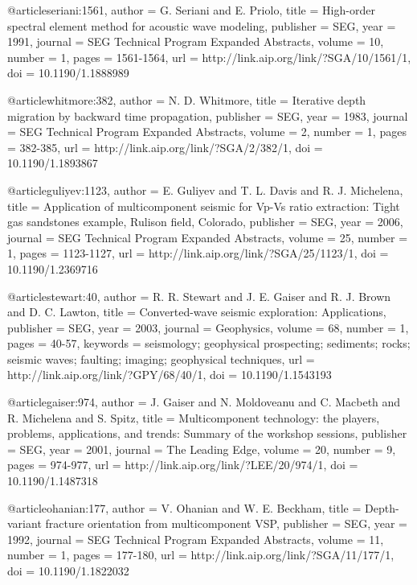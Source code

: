 {@article{seriani:1561,
  author =	 {G. Seriani and E. Priolo},
  title =	 {High-order spectral element method for acoustic wave
                  modeling},
  publisher =	 {SEG},
  year =	 1991,
  journal =	 {SEG Technical Program Expanded Abstracts},
  volume =	 10,
  number =	 1,
  pages =	 {1561-1564},
  url =		 {http://link.aip.org/link/?SGA/10/1561/1},
  doi =		 {10.1190/1.1888989}
}

@article{whitmore:382,
  author =	 {N. D. Whitmore},
  title =	 {Iterative depth migration by backward time
                  propagation},
  publisher =	 {SEG},
  year =	 1983,
  journal =	 {SEG Technical Program Expanded Abstracts},
  volume =	 2,
  number =	 1,
  pages =	 {382-385},
  url =		 {http://link.aip.org/link/?SGA/2/382/1},
  doi =		 {10.1190/1.1893867}
}

@article{guliyev:1123,
  author =	 {E. Guliyev and T. L. Davis and R.
                  J. Michelena},
  title =	 {Application of multicomponent seismic for Vp-Vs
                  ratio extraction: Tight gas sandstones example,
                  Rulison field, Colorado},
  publisher =	 {SEG},
  year =	 2006,
  journal =	 {SEG Technical Program Expanded Abstracts},
  volume =	 25,
  number =	 1,
  pages =	 {1123-1127},
  url =		 {http://link.aip.org/link/?SGA/25/1123/1},
  doi =		 {10.1190/1.2369716}
}

@article{stewart:40,
  author =	 {R. R. Stewart and J. E. Gaiser and R. J.
                  Brown and D. C. Lawton},
  title =	 {Converted-wave seismic exploration: Applications},
  publisher =	 {SEG},
  year =	 2003,
  journal =	 {Geophysics},
  volume =	 68,
  number =	 1,
  pages =	 {40-57},
  keywords =	 {seismology; geophysical prospecting; sediments;
                  rocks; seismic waves; faulting; imaging; geophysical
                  techniques},
  url =		 {http://link.aip.org/link/?GPY/68/40/1},
  doi =		 {10.1190/1.1543193}
}

@article{gaiser:974,
  author =	 {J. Gaiser and N. Moldoveanu and C. Macbeth
                  and R. Michelena and S. Spitz},
  title =	 {Multicomponent technology: the players, problems,
                  applications, and trends: Summary of the workshop
                  sessions},
  publisher =	 {SEG},
  year =	 2001,
  journal =	 {The Leading Edge},
  volume =	 20,
  number =	 9,
  pages =	 {974-977},
  url =		 {http://link.aip.org/link/?LEE/20/974/1},
  doi =		 {10.1190/1.1487318}
}

@article{ohanian:177,
  author =	 {V. Ohanian and W. E. Beckham},
  title =	 {Depth-variant fracture orientation from
                  multicomponent VSP},
  publisher =	 {SEG},
  year =	 1992,
  journal =	 {SEG Technical Program Expanded Abstracts},
  volume =	 11,
  number =	 1,
  pages =	 {177-180},
  url =		 {http://link.aip.org/link/?SGA/11/177/1},
  doi =		 {10.1190/1.1822032}
}

}
